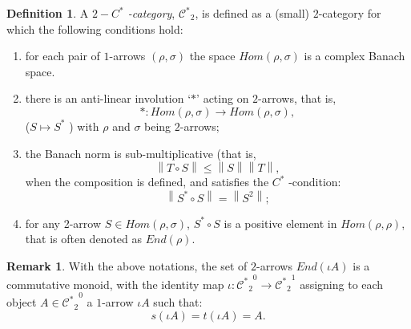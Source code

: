 \documentclass[12pt]{article}
\theoremstyle{plain}
\theoremstyle{definition}
\newtheorem{definition}{Definition}[section]
\newtheorem{remark}{Remark}[section]
\numberwithin{equation}{section}
\begin{document}
\begin{definition}

A \emph{$2-C^*$ -category}, ${\mathcal{C}^*}_2$, is defined as a (small) $2$-category for which the following 
conditions hold:

\begin{enumerate}
\item for each pair of $1$-arrows $(\rho, \sigma)$ the space $Hom(\rho, \sigma)$ is a complex Banach
space.
\item there is an anti-linear involution `$*$' acting on $2$-arrows, that is,
 $$ * : Hom(\rho, \sigma) \to Hom(\rho, \sigma),$$ ($ S \mapsto S^*$ ) with $\rho$ and $\sigma$ being $2$-arrows;
\item the Banach norm is sub-multiplicative (that is,  
$$\left\|T \circ S\right\| \leq \left\|S\right\|\left\|T\right\|,$$ when the composition is defined, 
and satisfies the $C^*$ -condition: 
$$\left\|S^* \circ S\right\| = \left\|S^2\right\|; $$ 
\item for any 2-arrow $S \in Hom(\rho, \sigma)$, $S^* \circ S$ is a positive element in 
$Hom(\rho, \rho)$, that is often denoted as $End(\rho)$.
\end{enumerate}


\end{definition}

\begin{remark}
 With the above notations, the set of $2$-arrows $End(\iota A)$ is a commutative monoid, with the identity map 
$\iota : {{\mathcal{C}^*}_2}^0 \to {{\mathcal{C}^*}_2}^1$ assigning to each object $A \in {{\mathcal{C}^*}_2}^0 $ a $1$-arrow $\iota A$ such that: $$s(\iota A) = t(\iota A) = A.$$ 
\end{remark}

\end{document}
